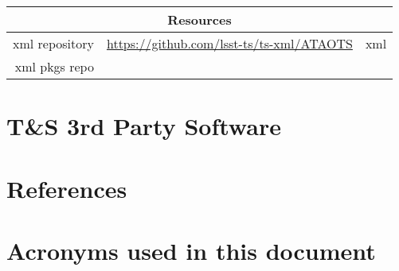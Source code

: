 \documentclass[TS,authoryear,toc,lsstdraft]{lsstdoc}
\begin{document}
\begin{longtable}[]{rll}
\hline
\multicolumn{3}{c}{\textbf{Resources}} \\ \hline
xml repository & \url{https://github.com/lsst-ts/ts-xml/ATAOTS} & xml \\ \hline
xml pkgs repo  &                                                &  \\ \hline
\end{longtable}





\newpage
\section{T\&S 3rd Party Software} \label{sec:3rd}




\appendix
\newpage
\section{References} \label{sec:bib}



\section{Acronyms used in this document}\label{sec:acronyms}

\end{document}

